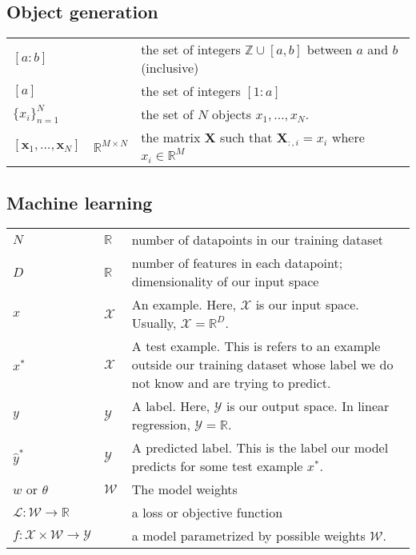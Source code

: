 \subsection*{Object generation}
\begin{tabular}{p{0.13\linewidth}p{0.07\linewidth}p{0.80\linewidth}}
  $[a:b]$                                &                           & the set of integers $\mathbb Z \cup [a, b]$ between $a$ and $b$ (inclusive) \\
  $[a]$                                  &                           & the set of integers $[1:a]$ \\
  $\{x_i\}_{n=1}^{N}$                    &                           & the set of $N$ objects $x_1, \dots, x_N$. \\
  $[\mathbf{x}_1, \ldots, \mathbf{x}_N]$ & $\mathbb{R}^{M \times N}$ & the matrix $\mathbf{X}$ such that $\mathbf{X}_{:,i} = x_i$ where $x_i \in \mathbb{R}^M$ \\
\end{tabular}

\subsection*{Machine learning}
\begin{tabular}{p{0.13\linewidth}p{0.07\linewidth}p{0.80\linewidth}}
  $N$ & $\mathbb R$ & number of datapoints in our training dataset \\
  $D$ & $\mathbb R$ & number of features in each datapoint; dimensionality of our input space \\
  $x$ & $\mathcal X$ & An example. Here, $\mathcal X$ is our input space. Usually, $\mathcal X = \mathbb R^D$. \\
  $x^*$ & $\mathcal X$ & A test example. This is refers to an example outside our training dataset whose label we do not know and are trying to predict. \\
  $y$ & $\mathcal Y$ & A label. Here, $\mathcal Y$ is our output space. In linear regression, $\mathcal Y = \mathbb R$. \\
  $\hat y^*$ &  $\mathcal Y$ & A predicted label. This is the label our model predicts for some test example $x^*$. \\
  $w$ or $\theta$ & $\mathcal W$ & The model weights \\
  $\mathcal L : \mathcal W \to \mathbb R$ & & a loss or objective function \\
  \mbox{$f : \mathcal X \times \mathcal W \to \mathcal Y$} & & a model parametrized by possible weights $\mathcal W$. \\
\end{tabular}

